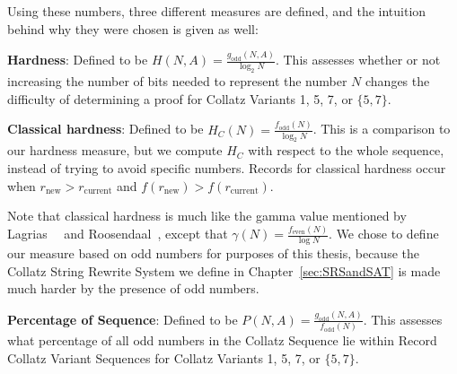 Using these numbers, three different measures are defined, and the intuition behind why they were chosen is given as well: \par
\textbf{Hardness}: Defined to be $H(N,A) = \frac{g_\text{odd}(N,A)}{\log_2{N}}$. This assesses whether or not increasing the number of bits needed to represent the number $N$ changes the difficulty of determining a proof for Collatz Variants  1, 5, 7, or $\{5,7\}$.  \par
\textbf{Classical hardness}: Defined to be $H_C(N) = \frac{f_\text{odd}(N)}{\log_2{N}}$. This is a comparison to our hardness measure, but we compute $H_C$ with respect to the whole sequence, instead of trying to avoid specific numbers. Records for classical hardness occur when $r_\text{new} > r_\text{current}$ and $f(r_\text{new}) > f(r_\text{current})$. \par
Note that classical hardness is much like the gamma value mentioned by Lagrias~\cite{2003mathLagrais}~\cite{2006mathLagrias} and Roosendaal~\cite{EricRoose}, except that $\gamma(N) = \frac{f_\text{even}(N)}{\log{N}}$. We chose to define our measure based on odd numbers for purposes of this thesis, because the Collatz String Rewrite System we define in Chapter~\ref{sec:SRSandSAT} is made much harder by the presence of odd numbers.\par
\textbf{Percentage of Sequence}: Defined to be $P(N,A) = \frac{g_\text{odd}(N,A)}{f_\text{odd}(N)}$. This assesses what percentage of all odd numbers in the Collatz Sequence lie within Record Collatz Variant Sequences for Collatz Variants 1, 5, 7, or $\{5,7\}$.


